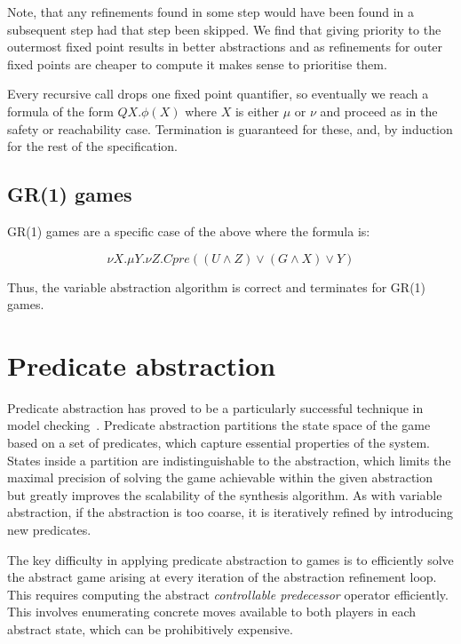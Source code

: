 Note, that any refinements found in some step would have been found in a subsequent step had that step been skipped. We find that giving priority to the outermost fixed point results in better abstractions and as refinements for outer fixed points are cheaper to compute it makes sense to prioritise them.

Every recursive call drops one fixed point quantifier, so eventually we reach a formula of the form $Q X. \phi(X)$ where $X$ is either $\mu$ or $\nu$ and proceed as in the safety or reachability case. Termination is guaranteed for these, and, by induction for the rest of the specification.

\subsection{GR(1) games}

GR(1) games are a specific case of the above where the formula is:

\begin{equation}
    \nu X. \mu Y. \nu Z. Cpre((U \wedge Z) \vee (G \wedge X) \vee Y)
\end{equation}

Thus, the variable abstraction algorithm is correct and terminates for GR(1) games.

\section{Predicate abstraction}

Predicate abstraction has proved to be a particularly successful technique in model checking~\cite{Graf_Saidi_97}. Predicate abstraction partitions the state space of the game based on a set of predicates, which capture essential properties of the system. States inside a partition are indistinguishable to the abstraction, which limits the maximal precision of solving the game achievable within the given abstraction but greatly improves the scalability of the synthesis algorithm. As with variable abstraction, if the abstraction is too coarse, it is iteratively refined by introducing new predicates.

The key difficulty in applying predicate abstraction to games is to efficiently solve the abstract game arising at every iteration of the abstraction refinement loop. This requires computing the abstract \emph{controllable predecessor} operator efficiently. This involves enumerating concrete moves available to both players in each abstract state, which can be prohibitively expensive.  

